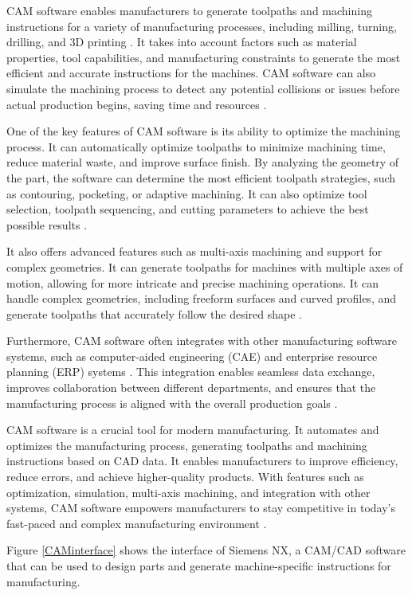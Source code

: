 CAM software enables manufacturers to generate toolpaths and machining instructions for a variety of manufacturing processes, including milling, turning, drilling, and 3D printing \cite{Kumar.2019}. It takes into account factors such as material properties, tool capabilities, and manufacturing constraints to generate the most efficient and accurate instructions for the machines. CAM software can also simulate the machining process to detect any potential collisions or issues before actual production begins, saving time and resources \cite{Bui.2019}.

One of the key features of CAM software is its ability to optimize the machining process. It can automatically optimize toolpaths to minimize machining time, reduce material waste, and improve surface finish. By analyzing the geometry of the part, the software can determine the most efficient toolpath strategies, such as contouring, pocketing, or adaptive machining. It can also optimize tool selection, toolpath sequencing, and cutting parameters to achieve the best possible results \cite{Kyratsis.2020}.

It also offers advanced features such as multi-axis machining and support for complex geometries. It can generate toolpaths for machines with multiple axes of motion, allowing for more intricate and precise machining operations. It can handle complex geometries, including freeform surfaces and curved profiles, and generate toolpaths that accurately follow the desired shape \cite{Liang.2021}.

Furthermore, CAM software often integrates with other manufacturing software systems, such as computer-aided engineering (CAE) and enterprise resource planning (ERP) systems \cite{Ramazanov.2020}. This integration enables seamless data exchange, improves collaboration between different departments, and ensures that the manufacturing process is aligned with the overall production goals \cite{Kadam.2023}.

CAM software is a crucial tool for modern manufacturing. It automates and optimizes the manufacturing process, generating toolpaths and machining instructions based on CAD data. It enables manufacturers to improve efficiency, reduce errors, and achieve higher-quality products. With features such as optimization, simulation, multi-axis machining, and integration with other systems, CAM software empowers manufacturers to stay competitive in today's fast-paced and complex manufacturing environment \cite{Kappmeyer.2021}.

Figure \ref{CAMinterface} shows the interface of Siemens NX, a CAM/CAD software that can be used to design parts and generate machine-specific instructions for manufacturing. 

